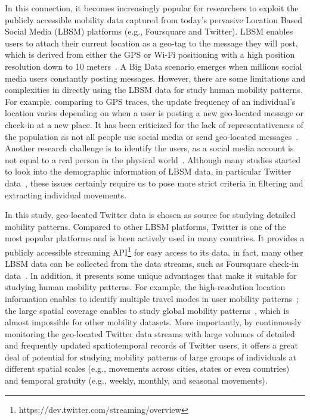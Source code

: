 \documentclass[ijgi,article,submit,moreauthors,pdftex,10pt,a4paper]{mdpi}
\theoremstyle{mdpi}
\newcounter{ex}
\newcounter{re}
\theoremstyle{mdpidefinition}
\begin{document}
In this connection, it becomes increasingly popular for researchers to exploit the publicly accessible mobility data captured from today's pervasive Location Based Social Media (LBSM) platforms (e.g., Foursquare and Twitter). 
LBSM enables users to attach their current location as a geo-tag to the message they will post, which is derived from either the GPS or Wi-Fi positioning with a high position resolution down to 10 meters~\cite{Jurdak2015}.
A Big Data scenario emerges when millions social media users constantly posting messages.
However, there are some limitations and complexities in directly using the LBSM data for study human mobility patterns. 
For example, comparing to GPS traces, the update frequency of an individual's location varies depending on when a user is posting a new geo-located message or check-in at a new place. It has been criticized for the lack of representativeness of the population as not all people use social media or send geo-located messages~\cite{kung2014exploring}. Another research challenge is to identify the users, as a social media account is not equal to a real person in the physical world~\cite{tsou2015}.
Although many studies started to look into the demographic information of LBSM data, in particular Twitter data~\cite{mitchell2013geography,longley2015geotemporal}, these issues certainly require us to pose more strict criteria in filtering and extracting individual movements.

In this study, geo-located Twitter data is chosen as source for studying detailed mobility patterns. Compared to other LBSM platforms, Twitter is one of the most popular platforms and is been actively used in many countries. It provides a publicly accessible streaming API\footnote{https://dev.twitter.com/streaming/overview} for easy access to its data, in fact, many other LBSM data can be collected from the data streams, such as Foursquare check-in data~\cite{cranshaw2012livehoods, hasan2013understanding}.
In addition, it presents some unique advantages that make it suitable for studying human mobility patterns.
For example, the high-resolution location information enables to identify multiple travel modes in user mobility patterns~\cite{Jurdak2015}; the large spatial coverage enables to study global mobility patterns~\cite{hawelka2014geo}, which is almost impossible for other mobility datasets.
More importantly, by continuously monitoring the geo-located Twitter data streams with large volumes of detailed and frequently updated spatiotemporal  records of Twitter users, it offers a great deal of potential for studying mobility patterns of large groups of individuals at different spatial scales (e.g., movements across cities, states or even countries) and temporal gratuity (e.g., weekly, monthly, and seasonal movements).
\end{document}
